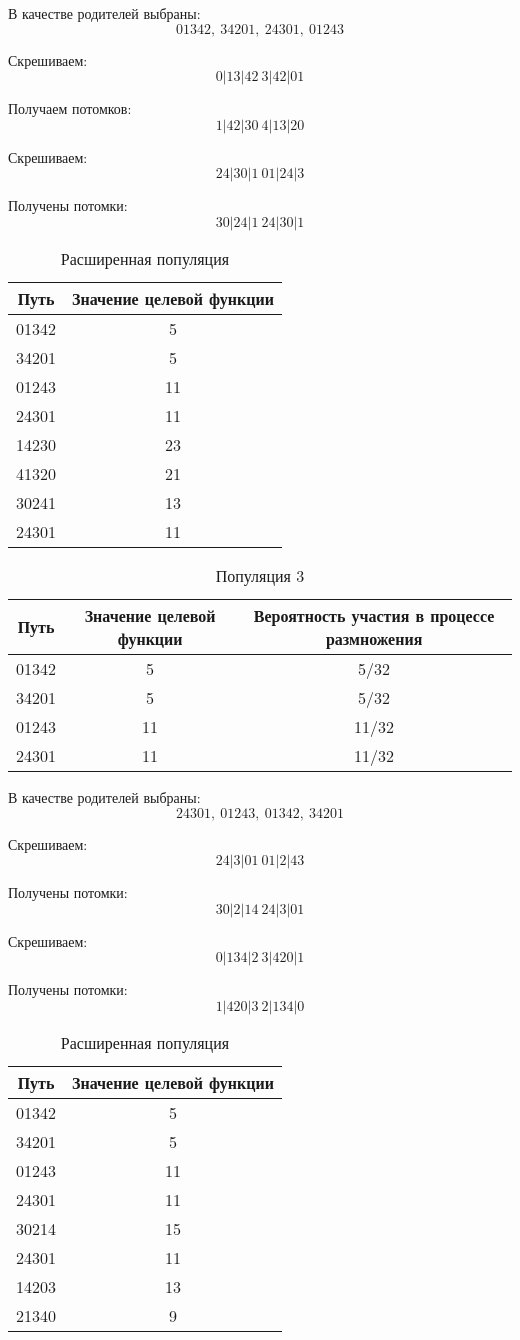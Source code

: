 \documentclass{article}
\begin{document}
В качестве родителей выбраны:
\[01342,\ 34201,\ 24301,\ 01243\]

Скрешиваем: \[0|13|42\ 3|42|01\]

Получаем потомков:\[1|42|30\ 4|13|20\]

Скрешиваем: \[24|30|1\ 01|24|3\]

Получены потомки:\[30|24|1\ 24|30|1\]

\begin{table}[H]
    \centering
    \caption{Расширенная популяция}
    \begin{tabular}{|c|c|}
    \hline
    Путь& Значение целевой функции\\
    \hline
    01342 & 5\\
    34201 & 5\\
    01243 & 11\\
    24301 & 11\\
    14230 & 23\\
    41320 & 21\\
    30241 & 13\\
    24301 & 11\\
    
    \hline
    \end{tabular}
\end{table}

\begin{table}[H]
    \centering
    \caption{Популяция 3}
    \begin{tabular}{|c|c|c|}
    \hline
    Путь& Значение целевой функции& Вероятность участия в процессе размножения\\
    \hline
    01342 & 5 & 5/32\\
    34201 & 5 & 5/32\\
    01243 & 11 & 11/32\\
    24301 & 11 & 11/32\\\hline
    \end{tabular}
\end{table}

В качестве родителей выбраны:
\[24301,\ 01243,\ 01342,\ 34201\]

Скрешиваем: \[24|3|01\ 01|2|43\]

Получены потомки: \[30|2|14\ 24|3|01\]

Скрешиваем: \[0|134|2\ 3|420|1\]

Получены потомки: \[1|420|3\ 2|134|0\]

\begin{table}[H]
    \centering
    \caption{Расширенная популяция}
    \begin{tabular}{|c|c|}
    \hline
    Путь& Значение целевой функции\\
    \hline
    01342 & 5\\
    34201 & 5\\
    01243 & 11\\
    24301 & 11\\
    30214 & 15\\
    24301 & 11\\
    14203 & 13\\
    21340 & 9\\
    \hline
    \end{tabular}
\end{table}
\end{document}
